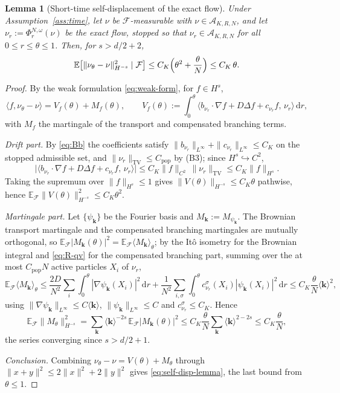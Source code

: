 \documentclass[a4paper,fleqn]{cas-sc}
\newtheorem{lemma}[theorem]{Lemma}
\theoremstyle{definition}
\theoremstyle{remark}
\begin{document}
\begin{lemma}[Short-time self-displacement of the exact flow]\label{lem:self-displacement}
Under Assumption~\ref{ass:time}, let $\nu$ be $\mathcal F$-measurable with
$\nu\in\mathcal A_{K,R,N}$, and let $\nu_r:=\Phi^{N,\omega}_r(\nu)$ be the exact flow, stopped
so that $\nu_r\in\mathcal A_{K,R,N}$ for all $0\le r\le\theta\le1$. Then, for $s>d/2+2$,
\begin{equation}\label{eq:self-disp-lemma}
\mathbb E\bigl[\|\nu_\theta-\nu\|_{H^{-s}}^2\mid\mathcal F\bigr]
\le C_K\Bigl(\theta^2+\frac{\theta}{N}\Bigr)\le C_K\,\theta .
\end{equation}
\end{lemma}

\begin{proof}
By the weak formulation \eqref{eq:weak-form}, for $f\in H^s$,
\[
\langle f,\nu_\theta-\nu\rangle
=V_f(\theta)+M_f(\theta),\qquad
V_f(\theta):=\int_0^\theta\langle b_{\nu_r}\!\cdot\!\nabla f+D\Delta f+c_{\nu_r}f,\,\nu_r\rangle\,\mathrm dr,
\]
with $M_f$ the martingale of the transport and compensated branching terms.

\emph{Drift part.} By \eqref{eq:Bb} the coefficients satisfy
$\|b_{\nu_r}\|_{L^\infty}+\|c_{\nu_r}\|_{L^\infty}\le C_K$ on the stopped admissible set, and
$\|\nu_r\|_{\mathrm{TV}}\le C_{\mathrm{pop}}$ by (B3); since $H^s\hookrightarrow C^2$,
\[
\bigl|\langle b_{\nu_r}\!\cdot\!\nabla f+D\Delta f+c_{\nu_r}f,\,\nu_r\rangle\bigr|
\le C_K\|f\|_{C^2}\,\|\nu_r\|_{\mathrm{TV}}\le C_K\|f\|_{H^s}.
\]
Taking the supremum over $\|f\|_{H^s}\le1$ gives $\|V(\theta)\|_{H^{-s}}\le C_K\theta$ pathwise,
hence $\mathbb E_{\mathcal F}\|V(\theta)\|_{H^{-s}}^2\le C_K\theta^2$.

\emph{Martingale part.} Let $\{\psi_{\mathbf k}\}$ be the Fourier basis and
$M_{\mathbf k}:=M_{\psi_{\mathbf k}}$. The Brownian transport martingale and the compensated
branching martingales are mutually orthogonal, so
$\mathbb E_{\mathcal F}|M_{\mathbf k}(\theta)|^2=\mathbb E_{\mathcal F}\langle M_{\mathbf k}\rangle_\theta$;
by the It\^o isometry for the Brownian integral and \eqref{eq:R-qv} for the compensated branching
part, summing over the at most $C_{\mathrm{pop}}N$ active particles $X_i$ of $\nu_r$,
\[
\mathbb E_{\mathcal F}\langle M_{\mathbf k}\rangle_\theta
\le\frac{2D}{N^2}\sum_i\int_0^\theta|\nabla\psi_{\mathbf k}(X_i)|^2\,\mathrm dr
+\frac1{N^2}\sum_{i,\sigma}\int_0^\theta c^\sigma_{\nu_r}(X_i)|\psi_{\mathbf k}(X_i)|^2\,\mathrm dr
\le C_K\frac{\theta}{N}\langle\mathbf k\rangle^2,
\]
using $\|\nabla\psi_{\mathbf k}\|_{L^\infty}\le C\langle\mathbf k\rangle$,
$\|\psi_{\mathbf k}\|_{L^\infty}\le C$ and $c^\sigma_{\nu_r}\le C_K$. Hence
\[
\mathbb E_{\mathcal F}\|M_\theta\|_{H^{-s}}^2
=\sum_{\mathbf k}\langle\mathbf k\rangle^{-2s}\,\mathbb E_{\mathcal F}|M_{\mathbf k}(\theta)|^2
\le C_K\frac{\theta}{N}\sum_{\mathbf k}\langle\mathbf k\rangle^{2-2s}\le C_K\frac{\theta}{N},
\]
the series converging since $s>d/2+1$.

\emph{Conclusion.} Combining $\nu_\theta-\nu=V(\theta)+M_\theta$ through
$\|x+y\|^2\le2\|x\|^2+2\|y\|^2$ gives \eqref{eq:self-disp-lemma}, the last bound from $\theta\le1$.
\end{proof}
\end{document}

